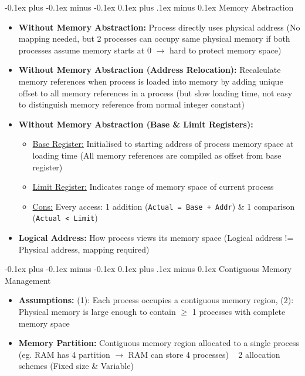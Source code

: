 \documentclass[landscape]{article}
\makeatletter
\renewcommand{\subsection}{\@startsection{subsection}{2}{0mm}%
  {-0.1ex plus -0.1ex minus -0.1ex}%
  {0.1ex plus .1ex minus 0.1ex}%
{\normalfont\scriptsize\bfseries}}
\makeatother
\begin{document}
\begin{multicols*}{6}
    \subsection{Memory Abstraction}
    \begin{itemize}
      \item \textbf{Without Memory Abstraction:} Process directly uses physical address (No mapping needed, but 2 processes can occupy same physical memory if both processes assume memory starts at 0 $\rightarrow$ hard to protect memory space)
      \item \textbf{Without Memory Abstraction (Address Relocation):} Recalculate memory references when process is loaded into memory by adding unique offset to all memory references in a process (but slow loading time, not easy to distinguish memory reference from normal integer constant)
      \item \textbf{Without Memory Abstraction (Base \& Limit Registers):}
      \begin{itemize}
        \item \underline{Base Register:} Initialised to starting address of process memory space at loading time (All memory references are compiled as offset from base register)
        \item \underline{Limit Register:} Indicates range of memory space of current process
        \item \underline{Cons:} Every access: 1 addition (\verb|Actual = Base + Addr|) \& 1 comparison (\verb|Actual < Limit|)
      \end{itemize}
      \item \textbf{Logical Address:} How process views its memory space (Logical address != Physical address, mapping required)
    \end{itemize}

    \subsection{Contiguous Memory Management}
    \begin{itemize}
      \item \textbf{Assumptions:} (1): Each process occupies a contiguous memory region, (2): Physical memory is large enough to contain $\geq$ 1 processes with complete memory space
      \item \textbf{Memory Partition:} Contiguous memory region allocated to a single process (eg. RAM has 4 partition $\rightarrow$ RAM can store 4 processes) ~ 2 allocation schemes (Fixed size \& Variable)
    \end{itemize}


\end{multicols*}
\end{document}

